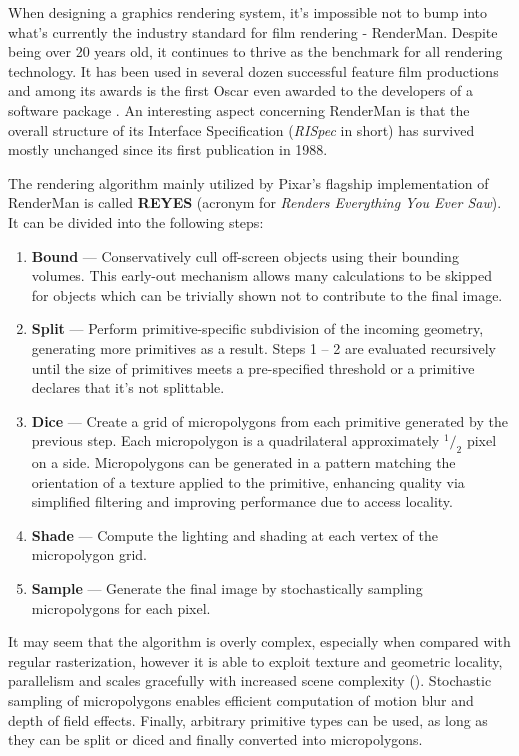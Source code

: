 
When designing a graphics rendering system, it's impossible not to bump into what's currently the industry standard for film rendering - RenderMan. Despite being over 20 years old, it continues to thrive as the benchmark for all rendering technology. It has been used in several dozen successful feature film productions and among its awards is the first Oscar even awarded to the developers of a software package \cite{RenderManAwards}. An interesting aspect concerning RenderMan is that the overall structure of its Interface Specification (\emph{RISpec} in short) has survived mostly unchanged since its first publication in 1988.

The rendering algorithm mainly utilized by Pixar's flagship implementation of RenderMan is called \textbf{REYES} (acronym for \emph{Renders Everything You Ever Saw}). It can be divided into the following steps:
	
\begin{enumerate}
\item \textbf{Bound} --- Conservatively cull off-screen objects using their bounding volumes. This early-out mechanism allows many calculations to be skipped for objects which can be trivially shown not to contribute to the final image.
\item \textbf{Split} --- Perform primitive-specific subdivision of the incoming geometry, generating more primitives as a result. Steps 1 -- 2 are evaluated recursively until the size of primitives meets a pre-specified threshold or a primitive declares that it's not splittable.
\item \textbf{Dice} --- Create a grid of micropolygons from each primitive generated by the previous step. Each micropolygon is a quadrilateral approximately $^1/_2$ pixel on a side. Micropolygons can be generated in a pattern matching the orientation of a texture applied to the primitive, enhancing quality via simplified filtering and improving performance due to access locality.
\item \textbf{Shade} --- Compute the lighting and shading at each vertex of the micropolygon grid.
\item \textbf{Sample} --- Generate the final image by stochastically sampling micropolygons for each pixel.
\end{enumerate}

It may seem that the algorithm is overly complex, especially when compared with regular rasterization, however it is able to exploit texture and geometric locality, parallelism and scales gracefully with increased scene complexity (\cite{Cook87reyes}). Stochastic sampling of micropolygons enables efficient computation of motion blur and depth of field effects. Finally, arbitrary primitive types can be used, as long as they can be split or diced and finally converted into micropolygons.

